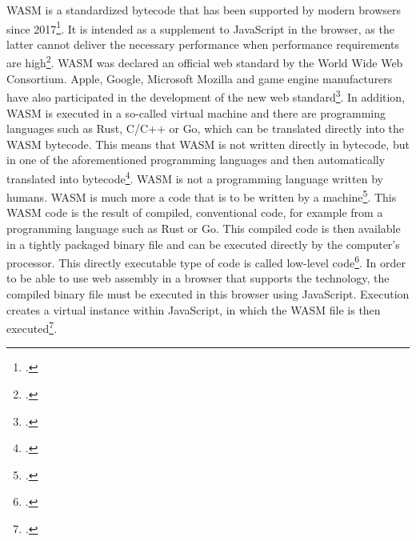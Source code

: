 WASM is a standardized bytecode that has been supported by modern browsers since 2017\footcite{niehoff_webassembly_nodate}. It is intended as a supplement to JavaScript in the browser, as the latter cannot deliver the necessary performance when performance requirements are high\footcite{zeroshope_was_2020}.
WASM was declared an official web standard by the World Wide Web Consortium. Apple, Google, Microsoft Mozilla and game engine manufacturers have also participated in the development of the new web standard\footcite[p. 49]{ct_heft_webassembly_2019}.
In addition, WASM is executed in a so-called virtual machine and there are programming languages such as Rust, C/C++ or Go, which can be translated directly into the WASM bytecode. This means that WASM is not written directly in bytecode, but in one of the aforementioned programming languages and then automatically translated into bytecode\footcite{niehoff_webassembly_nodate}.
WASM is not a programming language written by humans. WASM is much more a code that is to be written by a machine\footcite{tovilo_intersim_nodate}. This WASM code is the result of compiled, conventional code, for example from a programming language such as Rust or Go. This compiled code is then available in a tightly packaged binary file and can be executed directly by the computer's processor. This directly executable type of code is called low-level code\footcite{augsten_was_2018}.
In order to be able to use web assembly in a browser that supports the technology, the compiled binary file must be executed in this browser using JavaScript. Execution creates a virtual instance within JavaScript, in which the WASM file is then executed\footcite{augsten_was_2018}.
